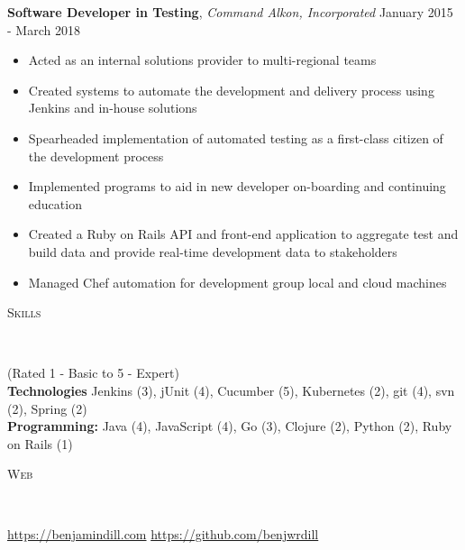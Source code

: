 \documentclass[9pt]{article}
\newenvironment{changemargin}[2]{%
  \begin{list}{}{%
      \setlength{\topsep}{0pt}%
      \setlength{\leftmargin}{#1}%
      \setlength{\rightmargin}{#2}%
      \setlength{\listparindent}{\parindent}%
      \setlength{\itemindent}{\parindent}%
      \setlength{\parsep}{\parskip}%
    }%
  \item[]}{\end{list}
}
\newcommand{\lineover}{
  \begin{changemargin}{-0.05in}{-0.05in}
    \vspace*{-8pt}
    \hrulefill \\
    \vspace*{-2pt}
  \end{changemargin}
}
\newcommand{\header}[1]{
  \begin{changemargin}{-0.5in}{-0.5in}
    \scshape{#1}\\
    \lineover
  \end{changemargin}
}
\newenvironment{body} {
  \vspace*{-16pt}
  \begin{changemargin}{-0.25in}{-0.5in}
  }	
  {\end{changemargin}
}
\begin{document}
\begin{body}
  \textbf{Software Developer in Testing}, \emph{Command Alkon, Incorporated} \hfill January 2015 - March 2018 \\
  \vspace*{-4pt}
  \begin{itemize} \itemsep -0pt  %
  \item Acted as an internal solutions provider to multi-regional teams
  \item Created systems to automate the development and delivery process using Jenkins and in-house solutions

  \item Spearheaded implementation of automated testing as a first-class citizen of the development process
  \item Implemented programs to aid in new developer on-boarding and continuing education
  \item Created a Ruby on Rails API and front-end application to aggregate test and build data and provide real-time development data to stakeholders
  \item Managed Chef automation for development group local and cloud machines
  \end{itemize}
  \vspace{17pt}

\end{body}

\smallskip


\header{Skills}

\begin{body}
  \vspace{17pt}
  {(Rated 1 - Basic to 5 - Expert)} \\
  \textbf{Technologies} Jenkins (3), jUnit (4), Cucumber (5), Kubernetes (2), git (4), svn (2), Spring (2) \\
  \textbf{Programming:} Java (4), JavaScript (4), Go (3), Clojure (2), Python (2), Ruby on Rails (1) \\
\end{body}

\smallskip

\header{Web}

\begin{body}
  \vspace{17pt}
  \url{https://benjamindill.com} \hfill{} \url{https://github.com/benjwrdill} \\
\end{body}
\end{document}
